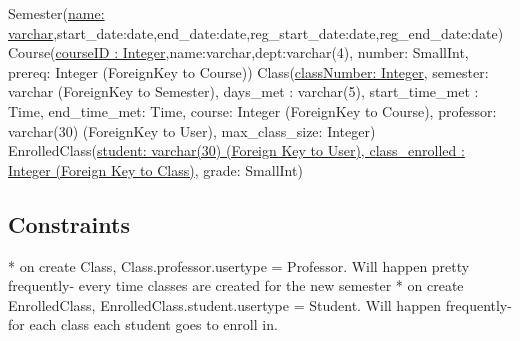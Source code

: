 \documentclass[11pt,oneside,a4paper]{article}
\begin{document}
Semester(\underline{name:
varchar},start\_date:date,end\_date:date,reg\_start\_date:date,reg\_end\_date:date)
Course(\underline{courseID	: Integer},name:varchar,dept:varchar(4), number:
SmallInt, prereq: Integer (ForeignKey to Course))
Class(\underline{classNumber: Integer}, semester: varchar (ForeignKey to
Semester), days\_met : varchar(5), start\_time\_met : Time, end\_time\_met:
Time, course: Integer (ForeignKey to Course), professor: varchar(30)
(ForeignKey to User), max\_class\_size: Integer)
EnrolledClass(\underline{student: varchar(30) (Foreign Key to User),
class\_enrolled : Integer (Foreign Key to Class)}, grade: SmallInt)

\subsection{Constraints}
	* on create Class, Class.professor.usertype = Professor. Will happen pretty
	frequently- every time classes are created for the new semester
	* on create EnrolledClass, EnrolledClass.student.usertype = Student. Will
	happen frequently- for each class each student goes to enroll in.
\end{document}
